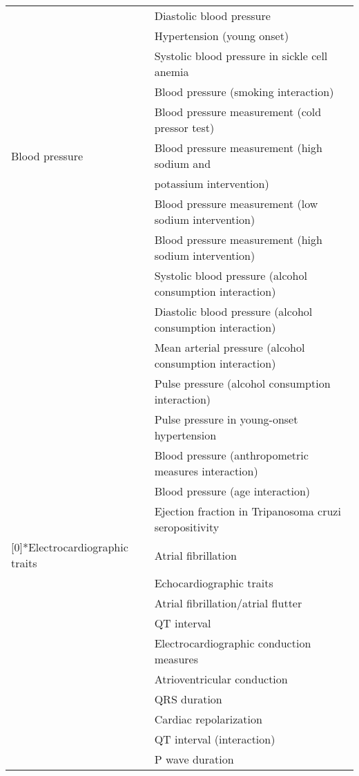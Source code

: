 \begin{small}
\begin{longtable}{ll}
          & Diastolic blood pressure \\
          & Hypertension (young onset) \\
          & Systolic blood pressure in sickle cell anemia \\
          & Blood pressure (smoking interaction) \\
          & Blood pressure measurement (cold pressor test) \\
        Blood pressure & Blood pressure measurement (high sodium and \\
          \addlinespace[-.5ex]
          & potassium intervention) \\
          & Blood pressure measurement (low sodium intervention) \\
          & Blood pressure measurement (high sodium intervention) \\
          & Systolic blood pressure (alcohol consumption interaction) \\
          & Diastolic blood pressure (alcohol consumption interaction) \\
          & Mean arterial pressure (alcohol consumption interaction) \\
          & Pulse pressure (alcohol consumption interaction) \\
          & Pulse pressure in young-onset hypertension \\
          & Blood pressure (anthropometric measures interaction) \\
          & Blood pressure (age interaction) \\
          & Ejection fraction in Tripanosoma cruzi seropositivity \\
              \addlinespace[1.5ex]
    \multirow{18}[0]{*}{Electrocardiographic traits} & Atrial fibrillation \\
          & Echocardiographic traits \\
          & Atrial fibrillation/atrial flutter \\
          & QT interval \\
          & Electrocardiographic conduction measures \\
          & Atrioventricular conduction \\
          & QRS duration \\
          & Cardiac repolarization \\
          & QT interval (interaction) \\
          & P wave duration \\

\end{longtable}
\end{small}

